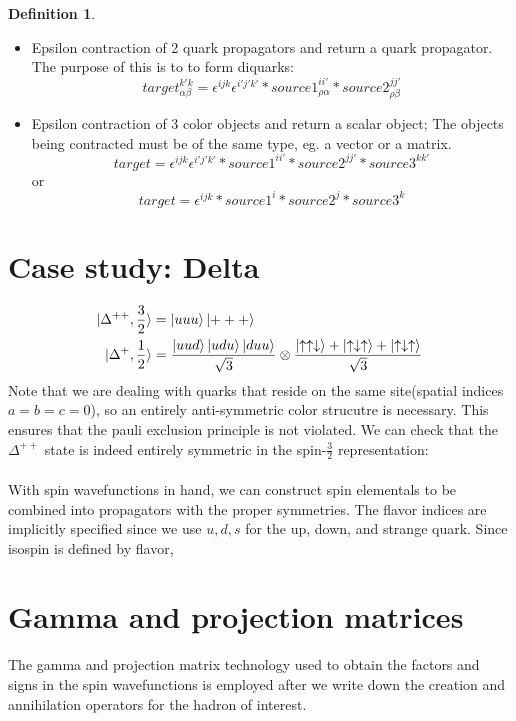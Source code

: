 \documentclass[prd,12pt,superscriptaddress,tightenlines,nofootinbib]{revtex4}
\theoremstyle{plain}
\theoremstyle{definition}
\newtheorem{defn}[thm]{Definition}
\theoremstyle{remark}
\begin{document}
\begin{defn}
\begin{itemize}
	\item Epsilon contraction of 2 quark propagators and return a quark propagator. The purpose of this is to 
	to form diquarks: 
	\[
target^{k' k}_{\alpha\beta} =
 \epsilon^{i j k}\epsilon^{i' j' k'}* source1^{i i'}_{\rho\alpha}* source2^{j j'}_{\rho\beta}
\]
	\item Epsilon contraction of 3 color objects and return a scalar object; The objects being contracted
	must be of the same type, eg. a vector or a matrix. 
	\[
target =
  \epsilon^{i j k}\epsilon^{i' j' k'}* source1^{i i'}* source2^{j j'}*source3^{k k'}
\]
or
\[
target =
 \epsilon^{i j k}* source1^{i}* source2^{j}*source3^{k}
\]  
\end{itemize}


\section{Case study: Delta}
\begin{align}
	\ket{\Delta^{++},\frac{3}{2}} &= \ket{uuu}\ket{+ + +} \\
	\ket{\Delta^{+},\frac{1}{2}}  &= \frac{\ket{uud} \ket{udu}  \ket{duu} }{\sqrt{3}} \otimes \frac{\ket{\uparrow\uparrow\downarrow} + \ket{\uparrow\downarrow\uparrow} + \ket{\uparrow\downarrow\uparrow}}{\sqrt{3}}
\end{align}
Note that we are dealing with quarks that reside on the same site(spatial indices $a = b = c = 0$), so an entirely anti-symmetric color strucutre is necessary. This ensures that 
the pauli exclusion principle is not violated. We can check that the $\Delta^{++}$ state is indeed entirely symmetric in the spin-$\frac{3}{2}$
representation: 
\begin{gather}
	
\end{gather}

With spin wavefunctions in hand, we can construct spin elementals to be combined into propagators with the proper symmetries. The flavor indices 
are implicitly specified since we use $u,d,s$ for the up, down, and strange quark. Since isospin is defined by flavor, 


\section{Gamma and projection matrices}
The gamma and projection matrix technology used to obtain the factors and signs in the spin wavefunctions is employed after we write down 
the creation and annihilation operators for the hadron of interest. 


\end{defn}
\end{document}
